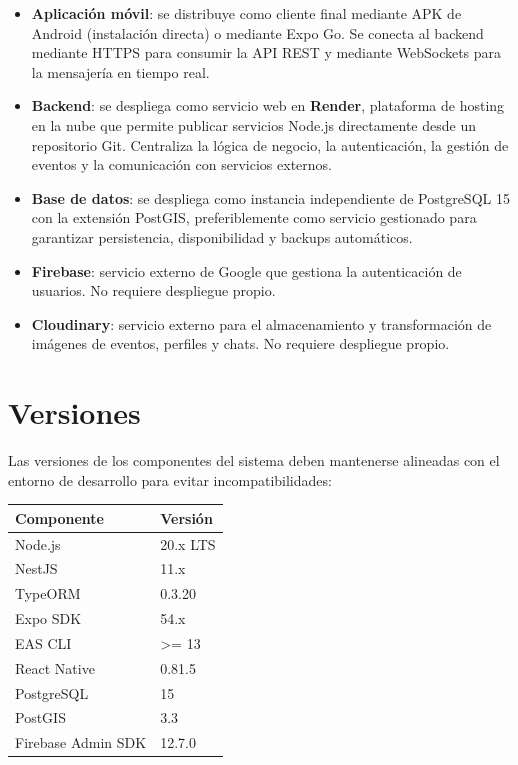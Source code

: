 \begin{itemize}
    \item \textbf{Aplicación móvil}: se distribuye como cliente final mediante APK de Android (instalación directa) o mediante Expo Go. Se conecta al backend mediante HTTPS para consumir la API REST y mediante WebSockets para la mensajería en tiempo real.

    \item \textbf{Backend}: se despliega como servicio web en \textbf{Render}, plataforma de hosting en la nube que permite publicar servicios Node.js directamente desde un repositorio Git. Centraliza la lógica de negocio, la autenticación, la gestión de eventos y la comunicación con servicios externos.

    \item \textbf{Base de datos}: se despliega como instancia independiente de PostgreSQL 15 con la extensión PostGIS, preferiblemente como servicio gestionado para garantizar persistencia, disponibilidad y backups automáticos.

    \item \textbf{Firebase}: servicio externo de Google que gestiona la autenticación de usuarios. No requiere despliegue propio.

    \item \textbf{Cloudinary}: servicio externo para el almacenamiento y transformación de imágenes de eventos, perfiles y chats. No requiere despliegue propio.
\end{itemize}

\section{Versiones}

Las versiones de los componentes del sistema deben mantenerse alineadas con el entorno de desarrollo para evitar incompatibilidades:

\begin{longtable}{|l|l|}
\hline
\textbf{Componente} & \textbf{Versión} \\
\hline
Node.js & 20.x LTS \\
NestJS & 11.x \\
TypeORM & 0.3.20 \\
Expo SDK & 54.x \\
EAS CLI & >= 13 \\
React Native & 0.81.5 \\
PostgreSQL & 15 \\
PostGIS & 3.3 \\
Firebase Admin SDK & 12.7.0 \\
\hline
\end{longtable}


